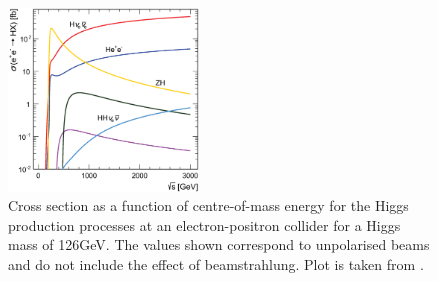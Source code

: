 \begin{figure}[tbph]
\centering
\includegraphics[width=0.45\textwidth]{theory/HiggsCLICcrossSection}
\caption[]
{Cross section as a function of centre-of-mass energy for the Higgs production processes at an electron-positron collider for a Higgs mass of 126GeV. The values shown correspond
to unpolarised beams and do not include the effect of beamstrahlung. Plot is taken from \cite{Abramowicz:2016zbo}.}
\label{fig:theoryHiggsCrossSection}
\end{figure}




